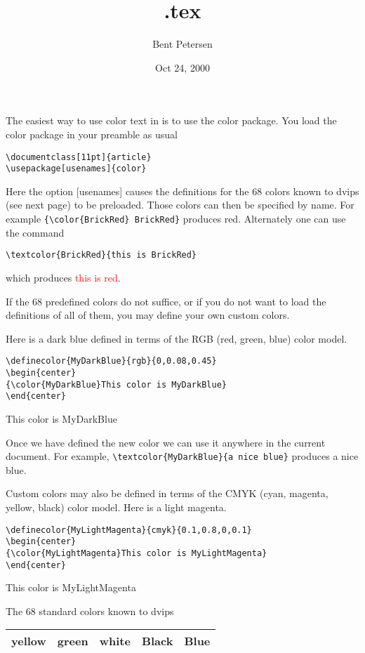\documentclass[11pt]{article}
\title{\color{blue}\jobname.tex}
\author{Bent Petersen}
\date{Oct 24, 2000}
\begin{document}
\maketitle
\thispagestyle{empty}

The easiest way to use color text in \LaTeXe{} is to use the color
package. You load the color package in your preamble as usual
\begin{verbatim}
\documentclass[11pt]{article}
\usepackage[usenames]{color}
\end{verbatim}
Here the option [usenames] causes the definitions for the 68 colors
known to dvips (see next page) to be preloaded. Those colors can then
be specified by name. For example \verb={\color{BrickRed} BrickRed}= 
produces {\color{red} red}. Alternately one can use the 
command 
\begin{verbatim}
\textcolor{BrickRed}{this is BrickRed}
\end{verbatim}
which produces \textcolor{red}{this is red}.

If the 68 predefined colors do not suffice, or if you do not want
to load the definitions of all of them, you may define your own
custom colors.

Here is a dark blue defined in terms of the RGB (red, green, blue) color model.
\begin{verbatim}
\definecolor{MyDarkBlue}{rgb}{0,0.08,0.45}
\begin{center}
{\color{MyDarkBlue}This color is MyDarkBlue}
\end{center}
\end{verbatim}
\begin{center}
{\color{MyDarkBlue}This color is MyDarkBlue}
\end{center}
Once we have defined the new color we can use it anywhere in
the current document. For example, 
\verb=\textcolor{MyDarkBlue}{a nice blue}= produces
\textcolor{MyDarkBlue}{a nice blue}.

Custom colors may also be defined in terms of the CMYK 
(cyan, magenta, yellow, black) 
color model. Here is a light magenta.
\begin{verbatim}
\definecolor{MyLightMagenta}{cmyk}{0.1,0.8,0,0.1}
\begin{center}
{\color{MyLightMagenta}This color is MyLightMagenta}
\end{center}
\end{verbatim}
\begin{center}
{\color{MyLightMagenta}This color is MyLightMagenta}
\end{center}

\begin{center}\large
The 68 standard colors known to dvips\vspace{0.5ex}
\begin{tabular}{|l|l|l|l|l|}
\hline
{\color{yellow} yellow}&
{\color{green} green}&
{\color{white} white}&
{\color{black} Black}&
{\color{blue} Blue}\\ \hline 
\end{tabular}
\end{center}
\end{document}
